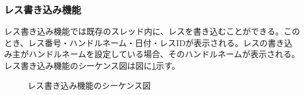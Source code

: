 \documentclass[a4j]{jarticle}
\begin{document}
\subsubsection{レス書き込み機能}
レス書き込み機能では既存のスレッド内に、レスを書き込むことができる。このとき、レス番号・ハンドルネーム・日付・レスIDが表示される。レスの書き込み主がハンドルネームを設定している場合、そのハンドルネームが表示される。
レス書き込み機能のシーケンス図は図に\ref{fig:bbs_res.png}示す。
        \begin{figure}[H]
\centering
{}
\caption{レス書き込み機能のシーケンス図}
\label{fig:bbs_res.png}
\end{figure}
\end{document}
